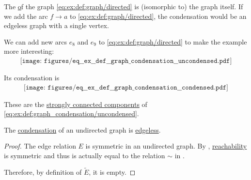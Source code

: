 \begin{example}\label{ex:def:graph_condensation}
  The \hyperref[def:graph_condensation] of the graph \eqref{eq:ex:def:graph/directed} is (isomorphic to) the graph itself. If we add the arc \( f \to a \) to \eqref{eq:ex:def:graph/directed}, the condensation would be an edgeless graph with a single vertex.

  We can add new arcs \( e_8 \) and \( e_9 \) to \eqref{eq:ex:def:graph/directed} to make the example more interesting:
  \begin{equation}\label{eq:ex:def:graph_condensation/uncondensed}
    \begin{aligned}
      \texttt{[image: figures/eq\_\_ex\_\_def\_\_graph\_condensation\_\_uncondensed.pdf]}
    \end{aligned}
  \end{equation}

  Its condensation is
  \begin{equation}\label{eq:ex:def:graph_condensation/condensed}
    \begin{aligned}
      \texttt{[image: figures/eq\_\_ex\_\_def\_\_graph\_condensation\_\_condensed.pdf]}
    \end{aligned}
  \end{equation}

  These are the \hyperref[def:graph_connectedness/strong]{strongly connected components} of \eqref{eq:ex:def:graph_condensation/uncondensed}.
\end{example}

\begin{proposition}\label{thm:undirected_graph_condensation}
  The \hyperref[def:graph_condensation]{condensation} of an undirected graph is \hyperref[def:graph_metamath/trivial]{edgeless}.
\end{proposition}
\begin{proof}
  The edge relation \( E \) is symmetric in an undirected graph. By , \hyperref[def:graph_directed_path/reachability]{reachability} is symmetric and thus is actually equal to the relation \( {\sim} \) in .

  Therefore, by definition of \( \widetilde{E} \), it is empty.
\end{proof}

